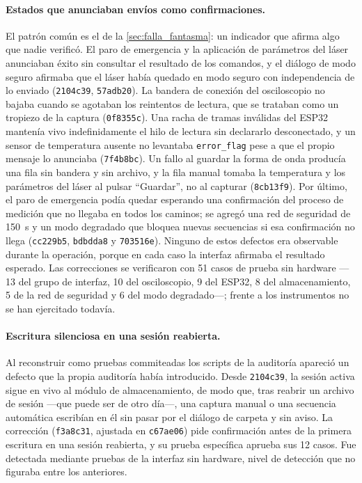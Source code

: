 \paragraph{Estados que anunciaban envíos como confirmaciones.} El
patrón común es el de la \cref{sec:falla_fantasma}: un indicador que
afirma algo que nadie verificó. El paro de emergencia y la aplicación
de parámetros del láser anunciaban éxito sin consultar el resultado de
los comandos, y el diálogo de modo seguro afirmaba que el láser había
quedado en modo seguro con independencia de lo enviado
(\texttt{2104c39}, \texttt{57adb20}). La bandera de conexión del
osciloscopio no bajaba cuando se agotaban los reintentos de lectura,
que se trataban como un tropiezo de la captura (\texttt{0f8355c}). Una
racha de tramas inválidas del ESP32 mantenía vivo indefinidamente el
hilo de lectura sin declararlo desconectado, y un sensor de temperatura
ausente no levantaba \texttt{error\_flag} pese a que el propio mensaje
lo anunciaba (\texttt{7f4b8bc}). Un fallo al guardar la forma de onda
producía una fila sin bandera y sin archivo, y la fila manual tomaba la
temperatura y los parámetros del láser al pulsar \enquote{Guardar}, no
al capturar (\texttt{8cb13f9}). Por último, el paro de emergencia
podía quedar esperando una confirmación del proceso de medición que no
llegaba en todos los caminos; se agregó una red de seguridad de
\SI{150}{\second} y un modo degradado que bloquea nuevas secuencias si
esa confirmación no llega (\texttt{cc229b5}, \texttt{bdbdda8} y
\texttt{703516e}). Ninguno de estos defectos era observable durante la
operación, porque en cada caso la interfaz afirmaba el resultado
esperado. Las correcciones se verificaron con 51 casos de prueba sin
hardware ---13 del grupo de interfaz, 10 del osciloscopio, 9 del ESP32,
8 del almacenamiento, 5 de la red de seguridad y 6 del modo
degradado---; frente a los instrumentos no se han ejercitado todavía.

\paragraph{Escritura silenciosa en una sesión reabierta.} Al
reconstruir como pruebas commiteadas los scripts de la auditoría
apareció un defecto que la propia auditoría había introducido. Desde
\texttt{2104c39}, la sesión activa sigue en vivo al módulo de
almacenamiento, de modo que, tras reabrir un archivo de sesión ---que
puede ser de otro día---, una captura manual o una secuencia automática
escribían en él sin pasar por el diálogo de carpeta y sin aviso. La
corrección (\texttt{f3a8c31}, ajustada en \texttt{c67ae06}) pide
confirmación antes de la primera escritura en una sesión reabierta, y
su prueba específica aprueba sus 12 casos. Fue detectada mediante pruebas de la interfaz sin hardware, nivel de
detección que no figuraba entre los anteriores.

